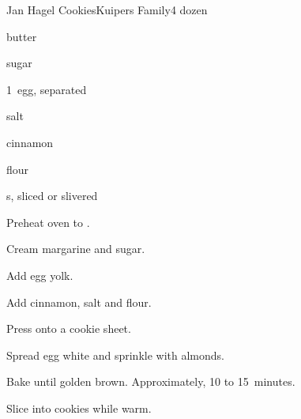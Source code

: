 \begin{recipe}{Jan Hagel Cookies}{Kuipers Family}{4 dozen}

\begin{ingredients}
\item {} butter
\item {} sugar
\item 1~egg, separated
\item \tp{\half} salt
\item \tp{\half} cinnamon
\item {} flour
\item {}s, sliced or slivered
\end{ingredients}

\begin{directions}
\item Preheat oven to .
\item Cream margarine and sugar.
\item Add egg yolk.
\item Add cinnamon, salt and flour.
\item Press onto a cookie sheet.
\item Spread egg white and sprinkle with almonds.
\item Bake until golden brown. Approximately, 10 to 15~minutes.
\item Slice into cookies while warm.
\end{directions}
\end{recipe}

